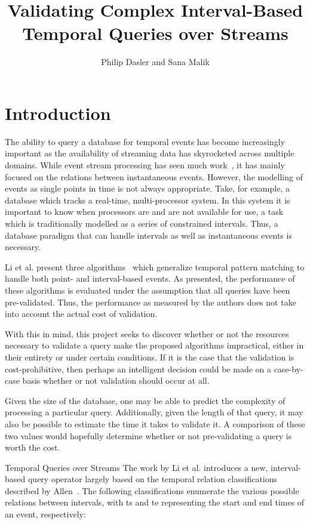 \documentclass[10pt,letterpaper]{article}
\title{Validating Complex Interval-Based Temporal Queries over Streams}
\author{Philip Dasler and Sana Malik}
\begin{document}
\maketitle
\section{Introduction}
The ability to query a database for temporal events has become increasingly important as the availability of streaming data has skyrocketed across multiple domains.  While event stream processing has seen much work~\cite{Agrawal:2008, Akdere:2008, Ding:2008, Wu:2006, Brenna:2007, Li:2009, Li:2010, Liu:2009}, it has mainly focused on the relations between instantaneous events.  However, the modelling of events as single points in time is not always appropriate.  Take, for example, a database which tracks a real-time, multi-processor system.  In this system it is important to know when processors are and are not available for use, a task which is traditionally modelled as a series of constrained intervals.  Thus, a database paradigm that can handle intervals as well as instantaneous events is necessary.

Li et al. present three algorithms~\cite{Li:2011} which generalize temporal pattern matching to handle both point- and interval-based events.  As presented, the performance of these algorithms is evaluated under the assumption that all queries have been pre-validated.  Thus, the performance as measured by the authors does not take into account the actual cost of validation.

With this in mind, this project seeks to discover whether or not the resources necessary to validate a query make the proposed algorithms impractical, either in their entirety or under certain conditions.  If it is the case that the validation is cost-prohibitive, then perhaps an intelligent decision could be made on a case-by-case basis whether or not validation should occur at all.  

Given the size of the database, one may be able to predict the complexity of processing a particular query.  Additionally, given the length of that query, it may also be possible to estimate the time it takes to validate it.  A comparison of these two values would hopefully determine whether or not pre-validating a query is worth the cost.  

Temporal Queries over Streams
The work by Li et al. introduces a new, interval-based query operator largely based on the temporal relation classifications described by Allen~\cite{Allen:1983}.  The following classifications enumerate the various possible relations between intervals, with ts and te representing the start and end times of an event, respectively:
\end{document}
